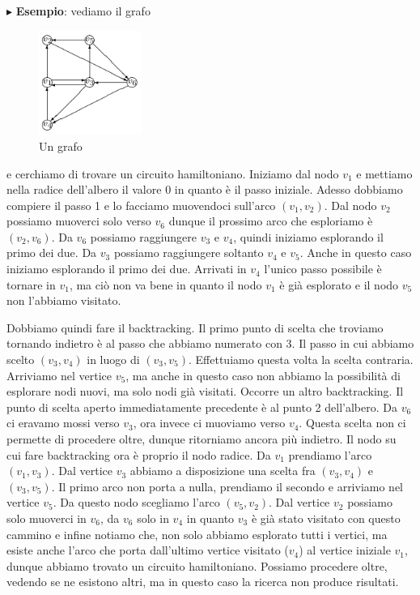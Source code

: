 \documentclass[11pt]{book}
\begin{document}
\vspace{11pt}
$\blacktriangleright$ {\bf Esempio}: vediamo il grafo 

\begin{figure}[H]
  \centering
  \includegraphics[width=0.3\textwidth]{images/cap7hamilton1.png}
  \caption{Un grafo}
  \label{cap7hamilton1}
\end{figure}

e cerchiamo di trovare un circuito hamiltoniano. Iniziamo dal nodo
$v_1$ e mettiamo nella radice dell'albero il valore 0 in quanto \`e il
passo iniziale. Adesso dobbiamo compiere il passo 1 e lo facciamo
muovendoci sull'arco $(v_1,v_2)$. Dal nodo $v_2$ possiamo muoverci
solo verso $v_6$ dunque il prossimo arco che esploriamo \`e
$(v_2,v_6)$. Da $v_6$ possiamo raggiungere $v_3$ e $v_4$, quindi
iniziamo esplorando il primo dei due. Da $v_3$ possiamo raggiungere
soltanto $v_4$ e $v_5$. Anche in questo caso iniziamo esplorando il
primo dei due. Arrivati in $v_4$ l'unico passo possibile \`e tornare
in $v_1$, ma ci\`o non va bene in quanto il nodo $v_1$ \`e gi\`a
esplorato e il nodo $v_5$ non l'abbiamo visitato. 

Dobbiamo quindi fare il backtracking. Il primo punto di scelta che
troviamo tornando indietro \`e al passo che abbiamo numerato con 3. Il
passo in cui abbiamo scelto $(v_3,v_4)$ in luogo di
$(v_3,v_5)$. Effettuiamo questa volta la scelta contraria. Arriviamo
nel vertice $v_5$, ma anche in questo caso non abbiamo la
possibilit\`a di esplorare nodi nuovi, ma solo nodi gi\`a
visitati. Occorre un altro backtracking. Il punto di scelta aperto
immediatamente precedente \`e al punto 2 dell'albero. Da $v_6$ ci
eravamo mossi verso $v_3$, ora invece ci muoviamo verso $v_4$. Questa
scelta non ci permette di procedere oltre, dunque ritorniamo ancora
pi\`u indietro. Il nodo su cui fare backtracking ora \`e proprio il
nodo radice. Da $v_1$ prendiamo l'arco $(v_1,v_3)$. Dal vertice $v_3$
abbiamo a disposizione una scelta fra $(v_3,v_4)$ e $(v_3,v_5)$. Il
primo arco non porta a nulla, prendiamo il secondo e arriviamo nel
vertice $v_5$. Da questo nodo scegliamo l'arco $(v_5, v_2)$. Dal
vertice $v_2$ possiamo solo muoverci in $v_6$, da $v_6$ solo in $v_4$
in quanto $v_3$ \`e gi\`a stato visitato con questo cammino e infine
notiamo che, non solo abbiamo esplorato tutti i vertici, ma esiste
anche l'arco che porta dall'ultimo vertice visitato ($v_4$) al vertice
iniziale $v_1$, dunque abbiamo trovato un circuito
hamiltoniano. Possiamo procedere oltre, vedendo se ne esistono altri,
ma in questo caso la ricerca non produce risultati.
\end{document}
